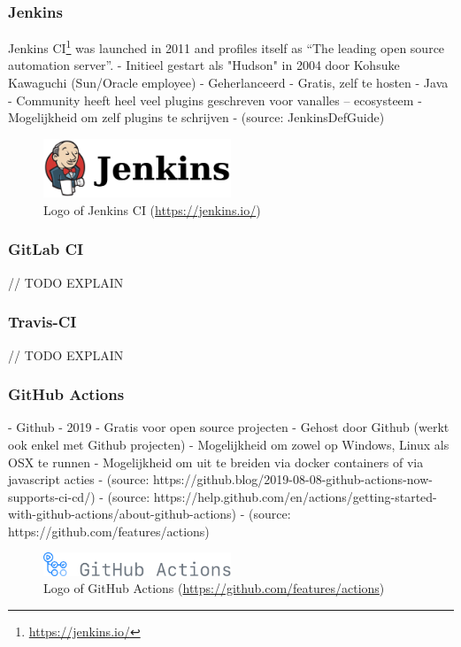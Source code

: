 \subsubsection{Jenkins}
Jenkins CI\footnote{\url{https://jenkins.io/}} was launched in 2011 and profiles itself as ``The leading open source automation server''.
- Initieel gestart als "Hudson" in 2004 door Kohsuke Kawaguchi (Sun/Oracle employee)
- Geherlanceerd
- Gratis, zelf te hosten
- Java
- Community heeft heel veel plugins geschreven voor vanalles -- ecosysteem
- Mogelijkheid om zelf plugins te schrijven
- (source: JenkinsDefGuide)

\begin{figure}[htbp!]
	\centering
	\includegraphics[width=0.5\textwidth]{assets/jenkins.pdf}
	\caption{Logo of Jenkins CI (\url{https://jenkins.io/})}
	\label{fig:jenkins}
\end{figure}

\subsubsection{GitLab CI}
// TODO EXPLAIN

\subsubsection{Travis-CI}
// TODO EXPLAIN

\subsubsection{GitHub Actions}
- Github
- 2019
- Gratis voor open source projecten
- Gehost door Github (werkt ook enkel met Github projecten)
- Mogelijkheid om zowel op Windows, Linux als OSX te runnen
- Mogelijkheid om uit te breiden via docker containers of via javascript acties
- (source: https://github.blog/2019-08-08-github-actions-now-supports-ci-cd/)
- (source: https://help.github.com/en/actions/getting-started-with-github-actions/about-github-actions)
- (source: https://github.com/features/actions)

\begin{figure}[htbp!]
	\centering
	\includegraphics[width=0.5\textwidth]{assets/github-actions.pdf}
	\caption{Logo of GitHub Actions (\url{https://github.com/features/actions})}
	\label{fig:github-actions}
\end{figure}